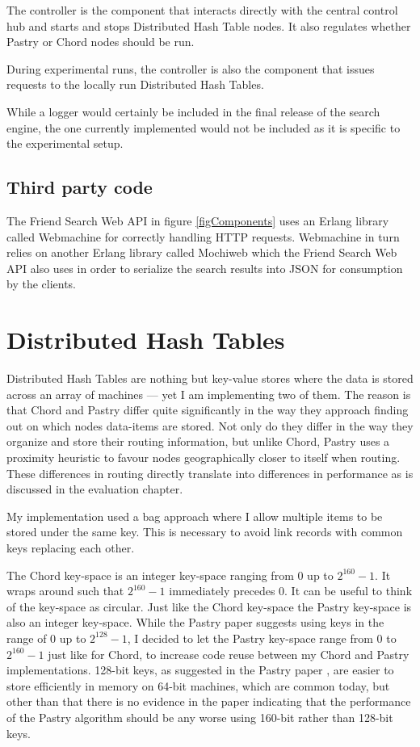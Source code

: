 The controller is the component that interacts directly with the central control hub and starts and stops Distributed Hash Table nodes. It also regulates whether Pastry or Chord nodes should be run.

During experimental runs, the controller is also the component that issues requests to the locally run Distributed Hash Tables.

While a logger would certainly be included in the final release of the search engine, the one currently implemented would not be included as it is specific to the experimental setup.

\subsection{Third party code}
The Friend Search Web API in figure \ref{figComponents} uses an Erlang library called Webmachine for correctly handling HTTP requests. Webmachine in turn relies on another Erlang library called Mochiweb which the Friend Search Web API also uses in order to serialize the search results into JSON for consumption by the clients.

\section{Distributed Hash Tables}
Distributed Hash Tables are nothing but key-value stores where the data is stored across an array of machines --- yet I am implementing two of them. The reason is that Chord and Pastry differ quite significantly in the way they approach finding out on which nodes data-items are stored. Not only do they differ in the way they organize and store their routing information, but unlike Chord, Pastry uses a proximity heuristic to favour nodes geographically closer to itself when routing. These differences in routing directly translate into differences in performance as is discussed in the evaluation chapter.

My implementation used a bag approach where I allow multiple items to be stored under the same key. This is necessary to avoid link records with common keys replacing each other.

The Chord key-space is an integer key-space ranging from 0 up to $2^{160} - 1$. It wraps around such that $2^{160} - 1$ immediately precedes 0. It can be useful to think of the key-space as circular. Just like the Chord key-space the Pastry key-space is also an integer key-space. While the Pastry paper \cite{pastry} suggests using keys in the range of 0 up to $2^{128} - 1$, I decided to let the Pastry key-space range from 0 to $2^{160} - 1$ just like for Chord, to increase code reuse between my Chord and Pastry implementations.
128-bit keys, as suggested in the Pastry paper \cite{pastry}, are easier to store efficiently in memory on 64-bit machines, which are common today, but other than that there is no evidence in the paper indicating that the performance of the Pastry algorithm should be any worse using 160-bit rather than 128-bit keys.

